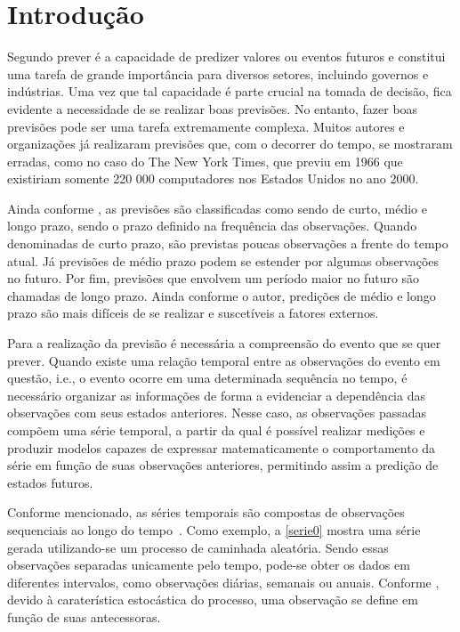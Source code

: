 \documentclass[
    12pt,
    oneside,
    a4paper,
    english,
    brazil
]{abntex2}
\begin{document}
\chapter{Introdução}


Segundo  prever é a capacidade de predizer valores ou eventos
futuros e  constitui uma  tarefa de grande  importância para  diversos setores,
incluindo governos e indústrias. Uma vez  que tal capacidade é parte crucial na
tomada de decisão,  fica evidente a necessidade de se  realizar boas previsões.
No entanto,  fazer boas  previsões pode ser  uma tarefa  extremamente complexa.
Muitos autores  e organizações já realizaram  previsões que, com o  decorrer do
tempo, se mostraram erradas, como no caso  do The New York Times, que previu em
1966  que existiriam  somente 220 000  computadores nos  Estados Unidos  no ano
2000.

Ainda conforme  , as  previsões são classificadas  como sendo
de  curto,  médio  e  longo  prazo,   sendo  o  prazo  definido  na  frequência
das  observações.  Quando denominadas  de  curto  prazo, são  previstas  poucas
observações  a frente  do tempo  atual. Já  previsões de  médio prazo  podem se
estender por algumas observações no futuro.  Por fim, previsões que envolvem um
período maior  no futuro são chamadas  de longo prazo. Ainda  conforme o autor,
predições de médio e longo prazo são mais difíceis de se realizar e suscetíveis
a fatores externos.

Para a realização da previsão é necessária  a compreensão do evento que se quer
prever. Quando  existe uma relação temporal  entre as observações do  evento em
questão,  i.e., o  evento  ocorre  em uma  determinada  sequência  no tempo,  é
necessário organizar  as informações  de forma a  evidenciar a  dependência das
observações com  seus estados anteriores.  Nesse caso, as  observações passadas
compõem uma  série temporal, a  partir da qual  é possível realizar  medições e
produzir modelos capazes de expressar  matematicamente o comportamento da série
em  função de  suas  observações  anteriores, permitindo  assim  a predição  de
estados futuros.

Conforme  mencionado,   as  séries  temporais  são   compostas  de  observações
sequenciais ao  longo do  tempo~\cite{wiley}. Como exemplo,  a \autoref{serie0}
mostra uma série gerada utilizando-se um processo de caminhada aleatória. Sendo
essas observações  separadas unicamente pelo  tempo, pode-se obter os  dados em
diferentes intervalos,  como observações diárias, semanais  ou anuais. Conforme
,  devido  à  caraterística  estocástica  do  processo,  uma
observação se define em função de suas antecessoras.
\end{document}
